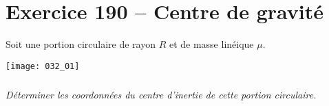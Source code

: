 \section*{Exercice 190 -- Centre de gravité}
\setcounter{exo}{0}

Soit une portion circulaire de rayon $R$ et de masse linéique $\mu$.

\begin{center}
\texttt{[image: 032\_01]}
\end{center}
\subparagraph{}
\textit{Déterminer les coordonnées du centre d'inertie de cette portion circulaire.}
\ifprof
\begin{corrige}

\end{corrige}
\else
\fi
